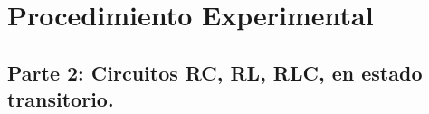 \documentclass[]{article}
\begin{document}


\section{Procedimiento Experimental}






















\subsection*{Parte 2: Circuitos RC, RL, RLC, en estado transitorio.}
\end{document}
